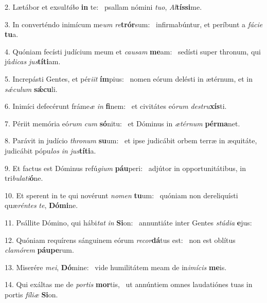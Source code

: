 2. Lætábor et exsul\textit{tá}\textit{bo} \textbf{in} te: \ast\  psallam nómini \textit{tu}\textit{o}, \textit{Al}\textbf{tís}\textbf{si}me.\

3. In converténdo inimícum me\textit{um} \textit{re}\textbf{trór}sum: \ast\  infirmabúntur, et períbunt a \textit{fá}\textit{ci}\textit{e} \textbf{tu}a.\

4. Quóniam fecísti judícium meum et \textit{cau}\textit{sam} \textbf{me}am: \ast\  sedísti super thronum, qui jú\textit{di}\textit{cas} \textit{jus}\textbf{tí}\textbf{ti}am.\

5. Increpásti Gentes, et pér\textit{i}\textit{it} \textbf{ím}pius: \ast\  nomen eórum delésti in ætérnum, et in \textit{sǽ}\textit{cu}\textit{lum} \textbf{sǽ}\textbf{cu}li.\

6. Inimíci defecérunt fráme\textit{æ} \textit{in} \textbf{fi}nem: \ast\  et civitátes eó\textit{rum} \textit{de}\textit{stru}\textbf{xís}ti.\

7. Périit memória eó\textit{rum} \textit{cum} \textbf{só}nitu: \ast\  et Dóminus in \textit{æ}\textit{tér}\textit{num} \textbf{pér}\textbf{ma}net.\

8. Parávit in judício \textit{thro}\textit{num} \textbf{su}um: \ast\  et ipse judicábit orbem terræ in æquitáte, judicábit pópu\textit{los} \textit{in} \textit{jus}\textbf{tí}\textbf{ti}a.\

9. Et factus est Dóminus refú\textit{gi}\textit{um} \textbf{páu}peri: \ast\  adjútor in opportunitátibus, in tri\textit{bu}\textit{la}\textit{ti}\textbf{ó}ne.\

10. Et sperent in te qui novérunt \textit{no}\textit{men} \textbf{tu}um: \ast\  quóniam non dereliquísti quæ\textit{rén}\textit{tes} \textit{te}, \textbf{Dó}\textbf{mi}ne.\

11. Psállite Dómino, qui hábi\textit{tat} \textit{in} \textbf{Si}on: \ast\  annuntiáte inter Gentes \textit{stú}\textit{di}\textit{a} \textbf{e}jus:\

12. Quóniam requírens sánguinem eórum \textit{re}\textit{cor}\textbf{dá}tus est: \ast\  non est oblítus \textit{cla}\textit{mó}\textit{rem} \textbf{páu}\textbf{pe}rum.\

13. Miserére \textit{me}\textit{i}, \textbf{Dó}mine: \ast\  vide humilitátem meam de in\textit{i}\textit{mí}\textit{cis} \textbf{me}is.\

14. Qui exáltas me de \textit{por}\textit{tis} \textbf{mor}tis, \ast\  ut annúntiem omnes laudatiónes tuas in portis \textit{fí}\textit{li}\textit{æ} \textbf{Si}on.\

